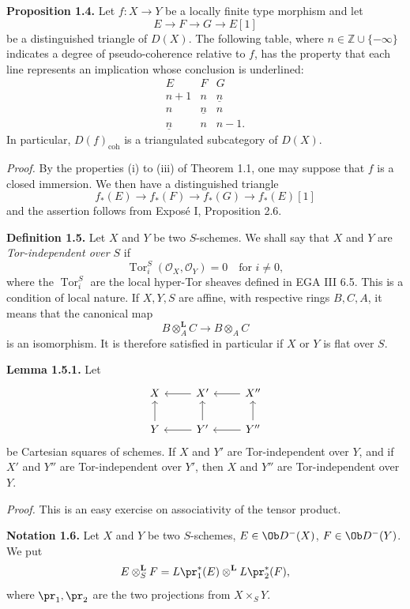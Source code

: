 \documentclass[11pt]{article}
\newcommand{\Tor}{\operatorname{Tor}}
\providecommand{\Tor}{\operatorname{Tor}}
\begin{document}
\textbf{Proposition 1.4.} Let \(f:X\to Y\) be a locally finite type morphism and let
\[
E\longrightarrow F\longrightarrow G\longrightarrow E[1]
\]
be a distinguished triangle of \(D(X)\). The following table, where \(n\in \mathbb Z\cup\{-\infty\}\) indicates a degree of pseudo-coherence relative to \(f\), has the property that each line represents an implication whose conclusion is underlined:
\[
\begin{array}{ccc}
E&F&G\\
n+1&n&\underline n\\
n&\underline n&n\\
\underline n&n&n-1.
\end{array}
\]
In particular, \(D(f)_{\mathrm{coh}}\) is a triangulated subcategory of \(D(X)\).

\emph{Proof.} By the properties (i) to (iii) of Theorem 1.1, one may suppose that \(f\) is a closed immersion. We then have a distinguished triangle
\[
f_*(E)\longrightarrow f_*(F)\longrightarrow f_*(G)\longrightarrow f_*(E)[1]
\]
and the assertion follows from Exposé I, Proposition 2.6.

\textbf{Definition 1.5.} Let \(X\) and \(Y\) be two \(S\)-schemes. We shall say that \(X\) and \(Y\) are \emph{Tor-independent over \(S\)} if
\[
  \Tor_i^S(\mathcal O_X,\mathcal O_Y)=0\quad\text{for }i\ne 0,
\]
where the \(\Tor_i^S\) are the local hyper-Tor sheaves defined in EGA III 6.5. This is a condition of local nature. If \(X,Y,S\) are affine, with respective rings \(B,C,A\), it means that the canonical map
\[
  B\otimes_A^{\mathbf L}C\longrightarrow B\otimes_A C
\]
is an isomorphism. It is therefore satisfied in particular if \(X\) or \(Y\) is flat over \(S\).

\textbf{Lemma 1.5.1.} Let
\[
\begin{tikzcd}
X & X' \arrow[l] & X'' \arrow[l]\\
Y \arrow[u] & Y' \arrow[l] \arrow[u] & Y'' \arrow[l] \arrow[u]
\end{tikzcd}
\]
be Cartesian squares of schemes. If \(X\) and \(Y'\) are Tor-independent over \(Y\), and if \(X'\) and \(Y''\) are Tor-independent over \(Y'\), then \(X\) and \(Y''\) are Tor-independent over \(Y\).

\emph{Proof.} This is an easy exercise on associativity of the tensor product.

\textbf{Notation 1.6.} Let \(X\) and \(Y\) be two \(S\)-schemes, \(E\in \Ob D^{-}(X)\), \(F\in \Ob D^{-}(Y)\). We put
\[
  E\otimes_S^{\mathbf L}F
  =
  L\pr_1^*(E)\otimes^{\mathbf L}L\pr_2^*(F),
\]
where \(\pr_1,\pr_2\) are the two projections from \(X\times_SY\).
\end{document}
